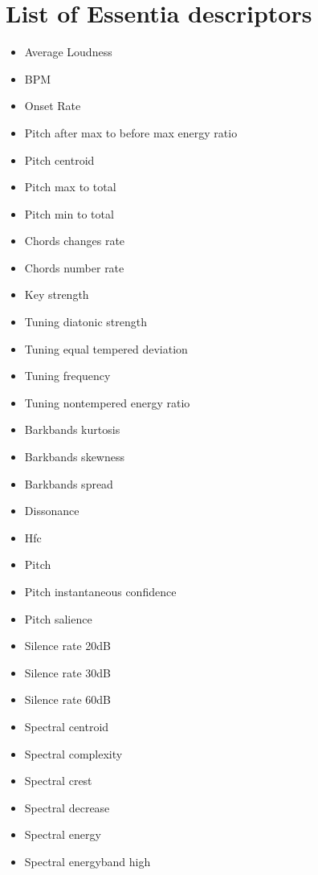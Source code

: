 \chapter{List of Essentia descriptors} %

\label{AppendixA} %


\begin{itemize}
\item Average Loudness
\item BPM
\item Onset Rate
\item Pitch after max to before max energy ratio
\item Pitch centroid
\item Pitch max to total
\item Pitch min to total
\item Chords changes rate
\item Chords number rate
\item Key strength
\item Tuning diatonic strength
\item Tuning equal tempered deviation
\item Tuning frequency
\item Tuning nontempered energy ratio
\item Barkbands kurtosis
\item Barkbands skewness
\item Barkbands spread
\item Dissonance
\item Hfc
\item Pitch
\item Pitch instantaneous confidence
\item Pitch salience
\item Silence rate 20dB
\item Silence rate 30dB
\item Silence rate 60dB
\item Spectral centroid
\item Spectral complexity
\item Spectral crest
\item Spectral decrease
\item Spectral energy
\item Spectral energyband high

\end{itemize}
